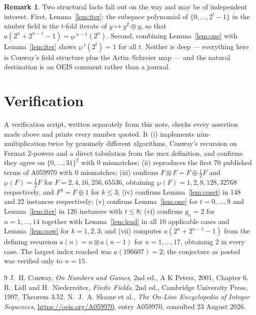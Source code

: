 \documentclass[11pt,a4paper]{article}
\theoremstyle{plain}
\theoremstyle{definition}
\newtheorem*{remark}{Remark}
\begin{document}
\begin{remark}
Two structural facts fall out on the way and may be of independent interest. First,
Lemma~\ref{lem:iter}: the subspace polynomial of $\{0,\dots,2^{t}-1\}$ in the nimber field
is the $t$-fold iterate of $y\mapsto y^{2}\oplus y$, so that
$a(2^{n}+2^{n-1}-1)=\wp^{\,n-1}(2^{n})$. Second, combining Lemma~\ref{lem:one} with
Lemma~\ref{lem:iter} shows $\wp^{\,t}(2^{t})=1$ for all $t$. Neither is deep ---
everything here is Conway's field structure plus the Artin--Schreier map --- and the
natural destination is an OEIS comment rather than a journal.
\end{remark}

\section{Verification}

A verification script, written separately from this note, checks every assertion made above
and prints every number quoted. It (i) implements nim-multiplication twice by genuinely
different algorithms, Conway's recursion on Fermat 2-powers and a direct tabulation from
the mex definition, and confirms they agree on $\{0,\dots,31\}^{2}$ with 0 mismatches;
(ii) reproduces the first 70 published terms of A059970 with 0 mismatches; (iii) confirms
$F\otimes F=F\oplus\tfrac12F$ and $\wp(F)=\tfrac12F$ for $F=2,4,16,256,65536$, obtaining
$\wp(F)=1,2,8,128,32768$ respectively, and $F^{q}=F\oplus1$ for $k\le3$; (iv) confirms
Lemma~\ref{lem:coset} in 148 and 22 instances respectively; (v) confirms
Lemma~\ref{lem:one} for $t=0,\dots,9$ and Lemma~\ref{lem:iter} in 126 instances with
$t\le8$; (vi) confirms $g_{n}=2$ for $n=1,\dots,14$ together with Lemma~\ref{lem:lead} in
all 10 applicable cases and Lemma~\ref{lem:pow} for $k=1,2,3$; and (vii) computes
$a(2^{n}+2^{n-1}-1)$ from the defining recursion $a(n)=n\otimes a(n-1)$ for
$n=1,\dots,17$, obtaining 2 in every case. The largest index reached was $a(196607)=2$; the
conjecture as posted was verified only to $n=15$.

\begin{thebibliography}{9}
 J.~H. Conway, \emph{On Numbers and Games}, 2nd ed., A K Peters, 2001,
Chapter 6.
 R.~Lidl and H.~Niederreiter, \emph{Finite Fields}, 2nd ed., Cambridge
University Press, 1997, Theorem 3.52.
 N.~J.~A. Sloane et al., \emph{The On-Line Encyclopedia of Integer
Sequences}, \url{https://oeis.org/A059970}, entry A059970, consulted 23 August 2026.
\end{thebibliography}
\end{document}
